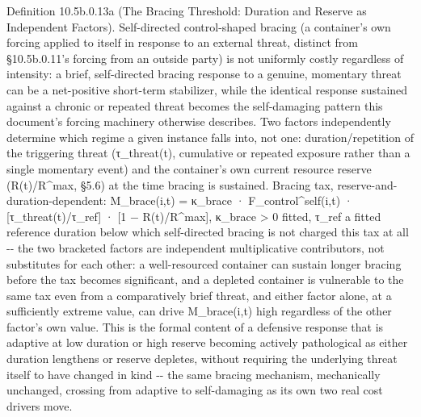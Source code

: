 \documentclass[
]{article}
\begin{document}
Definition 10.5b.0.13a (The Bracing Threshold: Duration and Reserve as
Independent Factors). Self-directed control-shaped bracing (a container's
own forcing applied to itself in response to an external threat,
distinct from §10.5b.0.11's forcing from an outside party) is not
uniformly costly regardless of intensity: a brief, self-directed bracing
response to a genuine, momentary threat can be a net-positive short-term
stabilizer, while the identical response sustained against a chronic or
repeated threat becomes the self-damaging pattern this document's forcing
machinery otherwise describes. Two factors independently determine which
regime a given instance falls into, not one: duration/repetition of the
triggering threat (τ\_threat(t), cumulative or repeated exposure rather
than a single momentary event) and the container's own current resource
reserve (R(t)/R\^{}max, §5.6) at the time bracing is sustained. Bracing
tax, reserve-and-duration-dependent: M\_brace(i,t) = κ\_brace ·
F\_control\^{}self(i,t) · {[}τ\_threat(t)/τ\_ref{]} · {[}1 −
R(t)/R\^{}max{]}, κ\_brace \textgreater{} 0 fitted, τ\_ref a fitted
reference duration below which self-directed bracing is not charged this
tax at all -\/- the two bracketed factors are independent multiplicative
contributors, not substitutes for each other: a well-resourced container
can sustain longer bracing before the tax becomes significant, and a
depleted container is vulnerable to the same tax even from a
comparatively brief threat, and either factor alone, at a sufficiently
extreme value, can drive M\_brace(i,t) high regardless of the other
factor's own value. This is the formal content of a defensive response
that is adaptive at low duration or high reserve becoming actively
pathological as either duration lengthens or reserve depletes, without
requiring the underlying threat itself to have changed in kind -\/- the
same bracing mechanism, mechanically unchanged, crossing from adaptive
to self-damaging as its own two real cost drivers move.
\end{document}

